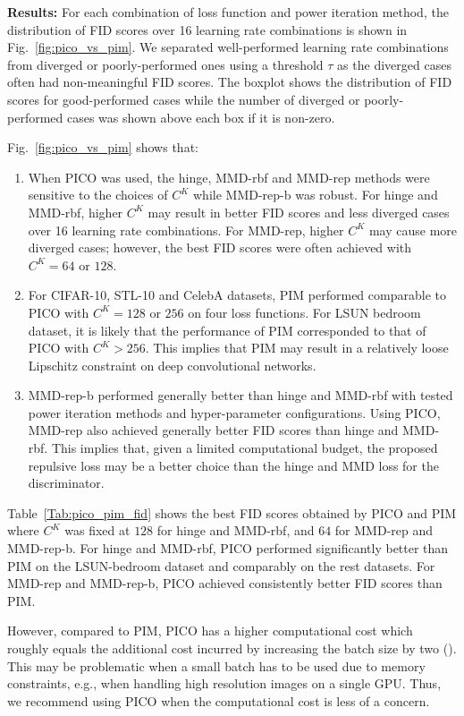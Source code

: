 \documentclass{article} %
\theoremstyle{plain}
\newtheorem*{proposition 1*}{Proposition 1}
\begin{document}
\begin{appendices}
\textbf{Results:} For each combination of loss function and power iteration method, the distribution of FID scores over 16 learning rate combinations is shown in Fig.~\ref{fig:pico_vs_pim}. We separated well-performed learning rate combinations from diverged or poorly-performed ones using a threshold \(\tau\) as the diverged cases often had non-meaningful FID scores. The boxplot shows the distribution of FID scores for good-performed cases while the number of diverged or poorly-performed cases was shown above each box if it is non-zero. 

Fig.~\ref{fig:pico_vs_pim} shows that:
\begin{enumerate}[label=\arabic*), leftmargin=*]
	\item When PICO was used, the hinge, MMD-rbf and MMD-rep methods were sensitive to the choices of \(C^K\) while MMD-rep-b was robust. For hinge and MMD-rbf, higher \(C^K\) may result in better FID scores and less diverged cases over 16 learning rate combinations. For MMD-rep, higher \(C^K\) may cause more diverged cases; however, the best FID scores were often achieved with \(C^K=64\) or \(128\).
	\item For CIFAR-10, STL-10 and CelebA datasets, PIM performed comparable to PICO with \(C^K=128\) or \(256\) on four loss functions. For LSUN bedroom dataset, it is likely that the performance of PIM corresponded to that of PICO with \(C^K>256\). This implies that PIM may result in a relatively loose Lipschitz constraint on deep convolutional networks. 
	\item MMD-rep-b performed generally better than hinge and MMD-rbf with tested power iteration methods and hyper-parameter configurations. Using PICO, MMD-rep also achieved generally better FID scores than hinge and MMD-rbf. This implies that, given a limited computational budget, the proposed repulsive loss may be a better choice than the hinge and MMD loss for the discriminator.
\end{enumerate}
Table~\ref{Tab:pico_pim_fid} shows the best FID scores obtained by PICO and PIM where \(C^K\) was fixed at \(128\) for hinge and MMD-rbf, and \(64\) for MMD-rep and MMD-rep-b. For hinge and MMD-rbf, PICO performed significantly better than PIM on the LSUN-bedroom dataset and comparably on the rest datasets. For MMD-rep and MMD-rep-b, PICO achieved consistently better FID scores than PIM. 

However, compared to PIM, PICO has a higher computational cost which roughly equals the additional cost incurred by increasing the batch size by two (\cite{pico_similar}). This may be problematic when a small batch has to be used due to memory constraints, e.g., when handling high resolution images on a single GPU. Thus, we recommend using PICO when the computational cost is less of a concern. 


\end{appendices}
\end{document}
